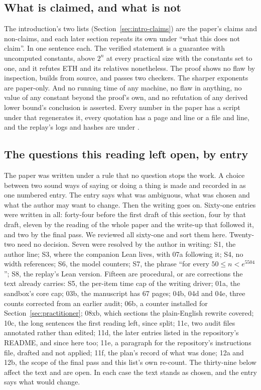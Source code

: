 \subsection{What is claimed, and what is not}
\label{sec:conclusion-claims}

The introduction's two lists (Section~\ref{sec:intro-claims}) are the
paper's claims and non-claims, and each later section repeats its own
under ``what this does not claim''. In one sentence each. The verified
statement is a guarantee with uncomputed constants, above $2^n$ at every
practical size with the constants set to one, and it refutes ETH and its
relatives nonetheless. The proof shows no flaw by inspection, builds
from source, and passes two checkers. The sharper exponents are
paper-only. And no running time of any machine, no flaw in anything,
no value of any constant beyond the proof's own, and no refutation of
any derived lower bound's conclusion is asserted. Every number in the
paper has a script under  that regenerates
it, every quotation has a page and line or a file and line, and the
replay's logs and hashes are under .

\subsection{The questions this reading left open, by entry}
\label{sec:conclusion-open}

The paper was written under a rule that no question stops the work.
A choice between two sound ways of saying or doing a thing is made and
recorded in  as one numbered entry.
The entry says what was ambiguous, what was chosen and what the author
may want to change. Then the writing goes on. Sixty-one entries were
written in all: forty-four before the first draft of this section,
four by that draft, eleven by the reading of the whole paper and the
write-up that followed it, and two by the final pass. We reviewed all
sixty-one and sort them here. Twenty-two need no decision. Seven were
resolved by the author in writing: S1, the author line; S3, where the
companion Lean lives, with 07a following it; S4, no width references;
S6, the model counters; S7, the phrase ``for every $50 \le n <
e^{5504}$''; S8, the replay's Lean version. Fifteen are procedural, or
are corrections the text already carries: S5, the per-item time cap of
the writing driver; 01a, the sandbox's core cap; 03b, the manuscript
has 67 pages; 04b, 04d and 04e, three counts corrected from an earlier
audit; 06b, a counter installed for Section~\ref{sec:practitioner};
08xb, which sections the plain-English rewrite covered; 10c, the long
sentences the first reading left, since split; 11c, two audit files
annotated rather than edited; 11d, the later entries listed in the
repository's README, and since here too; 11e, a paragraph for the
repository's instructions file, drafted and not applied; 11f, the
plan's record of what was done; 12a and 12b, the scope of the final
pass and this list's own re-count. The thirty-nine below affect the
text and are open. In each case the text stands as chosen, and the
entry says what would change.

